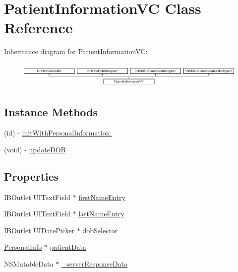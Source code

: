 \hypertarget{interface_patient_information_v_c}{\section{Patient\-Information\-V\-C Class Reference}
\label{interface_patient_information_v_c}
}
Inheritance diagram for Patient\-Information\-V\-C\-:\begin{figure}[H]
\begin{center}
\leavevmode
\includegraphics[height=1.308411cm]{interface_patient_information_v_c}
\end{center}
\end{figure}
\subsection*{Instance Methods}
\begin{DoxyCompactItemize}
\item 
(id) -\/ \hyperlink{interface_patient_information_v_c_ab98d9f44b4ee1c4b3051c017ebdac5c5}{init\-With\-Personal\-Information\-:}
\item 
(void) -\/ \hyperlink{interface_patient_information_v_c_ab6fee07f4777f557711e819c9a4cf3a4}{update\-D\-O\-B}
\end{DoxyCompactItemize}
\subsection*{Properties}
\begin{DoxyCompactItemize}
\item 
I\-B\-Outlet U\-I\-Text\-Field $\ast$ \hyperlink{interface_patient_information_v_c_a1836a8d8dc5e1a376109fb8b391c4038}{first\-Name\-Entry}
\item 
I\-B\-Outlet U\-I\-Text\-Field $\ast$ \hyperlink{interface_patient_information_v_c_a6523689959d35fa22fe3e01838ada93c}{last\-Name\-Entry}
\item 
I\-B\-Outlet U\-I\-Date\-Picker $\ast$ \hyperlink{interface_patient_information_v_c_a939dda6df517b4b5a4624928c77fe5b8}{dob\-Selector}
\item 
\hyperlink{interface_personal_info}{Personal\-Info} $\ast$ \hyperlink{interface_patient_information_v_c_afef82a462fd797cc833f72f3b33d9b3c}{patient\-Data}
\item 
N\-S\-Mutable\-Data $\ast$ \hyperlink{interface_patient_information_v_c_a17cd9e90386e04e545017658bf34582e}{\-\_\-server\-Response\-Data}
\end{DoxyCompactItemize}


